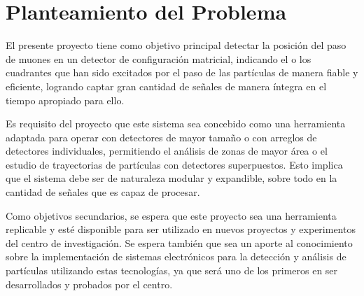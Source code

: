 \section{Planteamiento del Problema}
\label{sec:planteamiento}
	\par El presente proyecto tiene como objetivo principal detectar la posición del paso de muones en un detector de configuración matricial, indicando el o los cuadrantes que han sido excitados por el paso de las partículas de manera fiable y eficiente, logrando captar gran cantidad de señales de manera íntegra en el tiempo apropiado para ello.
	\par Es requisito del proyecto que este sistema sea concebido como una herramienta adaptada para operar con detectores de mayor tamaño o con arreglos de detectores individuales, permitiendo el análisis de zonas de mayor área o el estudio de trayectorias de partículas con detectores superpuestos. Esto implica que el sistema debe ser de naturaleza modular y expandible, sobre todo en la cantidad de señales que es capaz de procesar.
	\par Como objetivos secundarios, se espera que este proyecto sea una herramienta replicable y esté disponible para ser utilizado en nuevos proyectos y experimentos del centro de investigación. Se espera también que sea un aporte al conocimiento sobre la implementación de sistemas electrónicos para la detección y análisis de partículas utilizando estas tecnologías, ya que será uno de los primeros en ser desarrollados y probados por el centro.\\								



